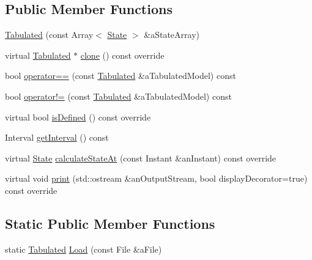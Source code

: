 \subsection*{Public Member Functions}
\begin{DoxyCompactItemize}
\item 
\hyperlink{classostk_1_1astro_1_1trajectory_1_1models_1_1_tabulated_a789aab702a52091467869fb78018b37d}{Tabulated} (const Array$<$ \hyperlink{classostk_1_1astro_1_1trajectory_1_1_state}{State} $>$ \&a\+State\+Array)
\item 
virtual \hyperlink{classostk_1_1astro_1_1trajectory_1_1models_1_1_tabulated}{Tabulated} $\ast$ \hyperlink{classostk_1_1astro_1_1trajectory_1_1models_1_1_tabulated_a553d2c4027ce269c1c2b3f4e9c65e14d}{clone} () const override
\item 
bool \hyperlink{classostk_1_1astro_1_1trajectory_1_1models_1_1_tabulated_aec2a2014af9276d9cc89cd1898a5d001}{operator==} (const \hyperlink{classostk_1_1astro_1_1trajectory_1_1models_1_1_tabulated}{Tabulated} \&a\+Tabulated\+Model) const
\item 
bool \hyperlink{classostk_1_1astro_1_1trajectory_1_1models_1_1_tabulated_a4ffc2bdbb107823f39fee423323b12cc}{operator!=} (const \hyperlink{classostk_1_1astro_1_1trajectory_1_1models_1_1_tabulated}{Tabulated} \&a\+Tabulated\+Model) const
\item 
virtual bool \hyperlink{classostk_1_1astro_1_1trajectory_1_1models_1_1_tabulated_a379da4c10a738c3f4578042c9bae0c91}{is\+Defined} () const override
\item 
Interval \hyperlink{classostk_1_1astro_1_1trajectory_1_1models_1_1_tabulated_ad385f1f0126aa00fbc33c120debff086}{get\+Interval} () const
\item 
virtual \hyperlink{classostk_1_1astro_1_1trajectory_1_1_state}{State} \hyperlink{classostk_1_1astro_1_1trajectory_1_1models_1_1_tabulated_af2ebaa6456986636aa58c2f8666ed0b9}{calculate\+State\+At} (const Instant \&an\+Instant) const override
\item 
virtual void \hyperlink{classostk_1_1astro_1_1trajectory_1_1models_1_1_tabulated_a330bfffa50eb77eb7f6d45cfec1e9e29}{print} (std\+::ostream \&an\+Output\+Stream, bool display\+Decorator=true) const override
\end{DoxyCompactItemize}
\subsection*{Static Public Member Functions}
\begin{DoxyCompactItemize}
\item 
static \hyperlink{classostk_1_1astro_1_1trajectory_1_1models_1_1_tabulated}{Tabulated} \hyperlink{classostk_1_1astro_1_1trajectory_1_1models_1_1_tabulated_a81cf8ebea4354805ab69e732bfe73d77}{Load} (const File \&a\+File)
\end{DoxyCompactItemize}
